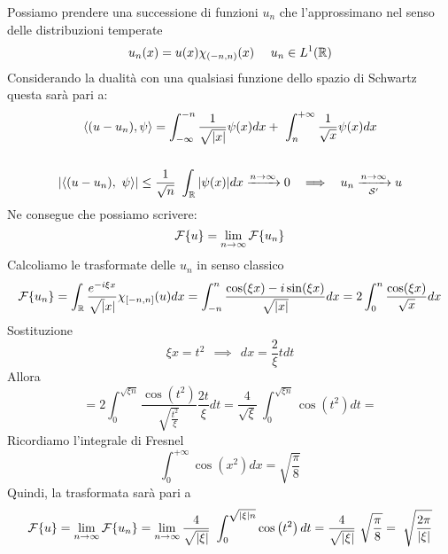 Possiamo prendere una successione di funzioni $u_{n}$ che l'approssimano nel senso delle distribuzioni temperate
\begin{equation*}
u_{n}(x) = u(x) \chi_{(- n, n)}(x) \ \ \ \ u_{n} \in L^{1} (\mathbb{R})
\end{equation*}
Considerando la dualità con una qualsiasi funzione dello spazio di Schwartz questa sarà pari a:
\begin{gather*}
\langle (u - u_{n}), \psi \rangle = \int^{- n}_{- \infty}\frac{1}{\sqrt{| x|}} \psi (x) dx + \ \int^{+ \infty}_{n}\frac{1}{\sqrt{x}} \psi (x) dx\\
\\
| \langle (u - u_{n}), \ \psi \rangle | \leq \frac{1}{\sqrt{n}} \ \int_{\RR}| \psi (x)| dx\xrightarrow{n\rightarrow \infty} 0\ \ \implies \ \ u_{n}\xrightarrow[\Sc ']{n\rightarrow \infty} u
\end{gather*}
Ne consegue che possiamo scrivere:
\begin{equation*}
\mathcal{F} \{u\} = \lim_{n\rightarrow \infty}\mathcal{F} \{u_{n}\}
\end{equation*}
Calcoliamo le trasformate delle $u_{n}$ in senso classico
\begin{equation*}
\mathcal{F} \{u_{n}\} = \int_{\mathbb{R}}\frac{e^{- i\xi x}}{\sqrt{|} x|} \chi_{[ - n, n]} (u)dx = \int^{n}_{- n}\frac{\cos(\xi x) - i\sin (\xi x)}{\sqrt{| x|}} dx = 2\int^{n}_{0}\frac{\cos(\xi x)}{\sqrt{x}} dx
\end{equation*}
Sostituzione
\begin{equation*}
\xi x = t^{2} \ \ \implies \ \ dx = \frac{2}{\xi} tdt
\end{equation*}
Allora
\begin{equation*}
= 2\int^{\sqrt{\xi n}}_{0}\frac{\cos\left(t^{2}\right)}{\sqrt{\frac{t^{2}}{\xi}}}\frac{2t}{\xi} dt = \frac{4}{\sqrt{\xi}} \ \int^{\sqrt{\xi n}}_{0}\cos\left(t^{2}\right) dt =
\end{equation*}
Ricordiamo l'integrale di Fresnel
\begin{equation*}
\int^{+ \infty}_{0}\cos\left(x^{2}\right) dx = \sqrt{\frac{\pi}{8}}
\end{equation*}
Quindi, la trasformata sarà pari a
\begin{equation*}
\Fc \{u\} = \lim_{n\rightarrow \infty}\Fc \{u_{n}\} = \lim_{n\rightarrow \infty}\frac{4}{\sqrt{| \xi |}} \ \int^{\sqrt{| \xi | n}}_{0}\cos\left(t^{2}\right) dt = \frac{4}{\sqrt{| \xi |}} \ \sqrt{\frac{\pi}{8}} = \ \sqrt{\frac{2\pi}{| \xi |}}
\end{equation*}
